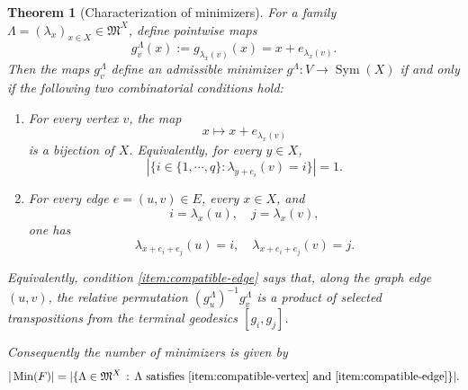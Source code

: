 \documentclass[11pt,oneside,letterpaper]{article}
\makeatletter
\newcommand{\namedlabel}[2]{\phantomsection\def\@currentlabel{#2}\label{#1}}
\numberwithin{equation}{section}
\newtheorem{theorem}{Theorem}
\theoremstyle{definition}
\theoremstyle{remark}
\DeclareMathOperator{\Sym}{Sym}
\makeatother
\begin{document}
\begin{theorem}[Characterization of minimizers]
  \label{thm:compatible-cut-geodesic-families}
  For a family $\Lambda=(\lambda_x)_{x\in X}\in\mathfrak{M}^X$, define
  pointwise maps
  \begin{equation}
    \label{eq:compatible-family-g}
    g_v^\Lambda(x):=g_{\lambda_x(v)}(x)=x+e_{\lambda_x(v)}.
  \end{equation}
  Then the maps $g_v^\Lambda$ define an admissible minimizer
  $g^\Lambda:V\to \Sym(X)$ if and only if the following two combinatorial
  conditions hold:

  \begin{enumerate}
  \item[\textup{(V)}] \namedlabel{item:compatible-vertex}{(V)}
    For every vertex $v$, the map
    \begin{equation}
      x\longmapsto x+e_{\lambda_x(v)}
    \end{equation}
    is a bijection of $X$.  Equivalently, for every $y\in X$,
    \begin{equation}
      \label{eq:vertex-bijection-condition}
      |\{i\in\{1,\cdots,q\}:\lambda_{y+e_i}(v)=i\}|=1.
    \end{equation}

  \item[\textup{(E)}] \namedlabel{item:compatible-edge}{(E)}
    For every edge $e=(u,v)\in E$, every $x\in X$, and
    \begin{equation}
      i=\lambda_x(u),\quad j=\lambda_x(v),
    \end{equation}
    one has
    \begin{equation}
      \label{eq:edge-geodesic-compatibility}
      \lambda_{x+e_i+e_j}(u)=i,\quad
      \lambda_{x+e_i+e_j}(v)=j.
    \end{equation}
  \end{enumerate}
  Equivalently, condition \ref{item:compatible-edge} says that, along
  the graph edge $(u,v)$, the relative permutation
  $(g_u^\Lambda)^{-1}g_v^\Lambda$ is a product of selected
  transpositions from the terminal geodesics $[g_i,g_j]$.

  Consequently the number of minimizers is given by
  \begin{equation}
    \label{eq:minimizer-count-compatible-families}
    |\operatorname{Min}(F)|
    = |\{\Lambda\in\mathfrak{M}^X \, : \, \Lambda \text{ satisfies \ref{item:compatible-vertex} and \ref{item:compatible-edge}}\}|.
  \end{equation}
\end{theorem}
\end{document}
